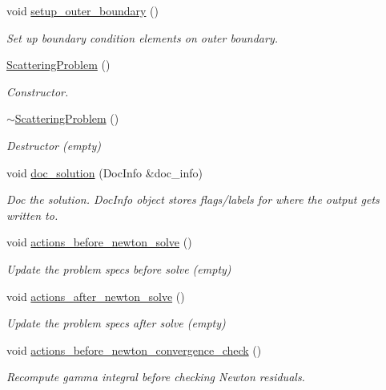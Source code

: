 \begin{DoxyCompactItemize}
void \hyperlink{classScatteringProblem_a76bd8299ea7ed559681b294acfb2aad4}{setup\+\_\+outer\+\_\+boundary} ()
\begin{DoxyCompactList}\small\item\em Set up boundary condition elements on outer boundary. \end{DoxyCompactList}\item 
\hyperlink{classScatteringProblem_a94710f5d2ee52abc3df9dc8d1fd3eb71}{Scattering\+Problem} ()
\begin{DoxyCompactList}\small\item\em Constructor. \end{DoxyCompactList}\item 
\hyperlink{classScatteringProblem_a0a9838027d0286f22706fe6945bbac0a}{$\sim$\+Scattering\+Problem} ()
\begin{DoxyCompactList}\small\item\em Destructor (empty) \end{DoxyCompactList}\item 
void \hyperlink{classScatteringProblem_af83ab14c4f4750ea17c21466f6c6364f}{doc\+\_\+solution} (Doc\+Info \&doc\+\_\+info)
\begin{DoxyCompactList}\small\item\em Doc the solution. Doc\+Info object stores flags/labels for where the output gets written to. \end{DoxyCompactList}\item 
void \hyperlink{classScatteringProblem_a91ce14b928ec6edbb9d85515a310b1fb}{actions\+\_\+before\+\_\+newton\+\_\+solve} ()
\begin{DoxyCompactList}\small\item\em Update the problem specs before solve (empty) \end{DoxyCompactList}\item 
void \hyperlink{classScatteringProblem_abf1e7b97518c94e12802205dec08b15e}{actions\+\_\+after\+\_\+newton\+\_\+solve} ()
\begin{DoxyCompactList}\small\item\em Update the problem specs after solve (empty) \end{DoxyCompactList}\item 
void \hyperlink{classScatteringProblem_ad096c311ee474d23514656d2ba76a4b8}{actions\+\_\+before\+\_\+newton\+\_\+convergence\+\_\+check} ()
\begin{DoxyCompactList}\small\item\em Recompute gamma integral before checking Newton residuals. \end{DoxyCompactList}\item 

\end{DoxyCompactItemize}
